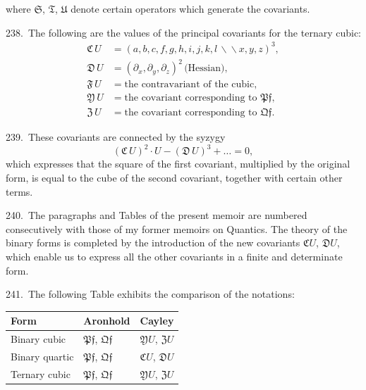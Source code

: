 \documentclass[11pt,a4paper]{book}
\begin{document}
where $\mathfrak{S}$, $\mathfrak{T}$, $\mathfrak{U}$ denote certain operators which generate the covariants.

\newpage
\setcounter{page}{334}

238.\ The following are the values of the principal covariants for the ternary cubic:
\begin{align*}
\mathfrak{C}\,U &= (a,b,c,f,g,h,i,j,k,l\,\backslash\!\!\backslash x,y,z)^3,\\
\mathfrak{D}\,U &= (\partial_x,\partial_y,\partial_z)^2\,\text{(Hessian)},\\
\mathfrak{F}\,U &= \text{the contravariant of the cubic},\\
\mathfrak{Y}\,U &= \text{the covariant corresponding to }\mathfrak{P}\mathfrak{f},\\
\mathfrak{Z}\,U &= \text{the covariant corresponding to }\mathfrak{Q}\mathfrak{f}.
\end{align*}

239.\ These covariants are connected by the syzygy
\[
(\mathfrak{C}\,U)^2\cdot U - (\mathfrak{D}\,U)^3 + \dots = 0,
\]
which expresses that the square of the first covariant, multiplied by the original form, is equal to the cube of the second covariant, together with certain other terms.

\newpage
\setcounter{page}{335}

240.\ The paragraphs and Tables of the present memoir are numbered consecutively with those of my former memoirs on Quantics. The theory of the binary forms is completed by the introduction of the new covariants $\mathfrak{C}U$, $\mathfrak{D}U$, which enable us to express all the other covariants in a finite and determinate form.

241.\ The following Table exhibits the comparison of the notations:

\begin{center}
\begin{tabular}{|l|l|l|}
\hline
\textbf{Form} & \textbf{Aronhold} & \textbf{Cayley} \\
\hline
Binary cubic & $\mathfrak{P}\mathfrak{f}$, $\mathfrak{Q}\mathfrak{f}$ & $\mathfrak{Y}U$, $\mathfrak{Z}U$ \\
Binary quartic & $\mathfrak{P}\mathfrak{f}$, $\mathfrak{Q}\mathfrak{f}$ & $\mathfrak{C}U$, $\mathfrak{D}U$ \\
Ternary cubic & $\mathfrak{P}\mathfrak{f}$, $\mathfrak{Q}\mathfrak{f}$ & $\mathfrak{Y}U$, $\mathfrak{Z}U$ \\
\hline
\end{tabular}
\end{center}
\end{document}
